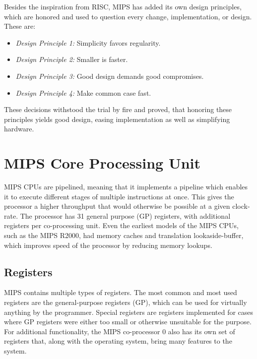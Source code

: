Besides the inspiration from RISC, MIPS has added its own design principles,
which are honored and used to question every change, implementation, or design.
These are:
\begin{itemize}
	\item \textit{Design Principle 1:} Simplicity favors regularity.
	\item \textit{Design Principle 2:} Smaller is faster.
	\item \textit{Design Principle 3:} Good design demands good compromises.
	\item \textit{Design Principle 4:} Make common case fast.
\end{itemize}
These decisions withstood the trial by fire and proved, that honoring these
principles yields good design, easing implementation as well as simplifying
hardware.


\section{MIPS Core Processing Unit}
MIPS CPUs are pipelined, meaning that it implements a pipeline which enables it
to execute different stages of multiple instructions at once. This gives the
processor a higher throughput that would otherwise be possible at a given
clock-rate. The processor has 31 general purpose (GP) registers, with additional registers
per co-processing unit. Even the earliest models of the MIPS CPUs, such as the
MIPS R2000, had memory caches and translation lookaside-buffer, which improves
speed of the processor by reducing memory lookups.

\subsection{Registers}
MIPS contains multiple types of registers. The most common and most used
registers are the general-purpose registers (GP), which can be used for
virtually anything by the programmer. Special registers are registers
implemented for cases where GP registers were either too small or otherwise
unsuitable for the purpose.\\
For additional functionality, the MIPS co-processor 0 also has its own set of
registers that, along with the operating system, bring many features to the
system.

